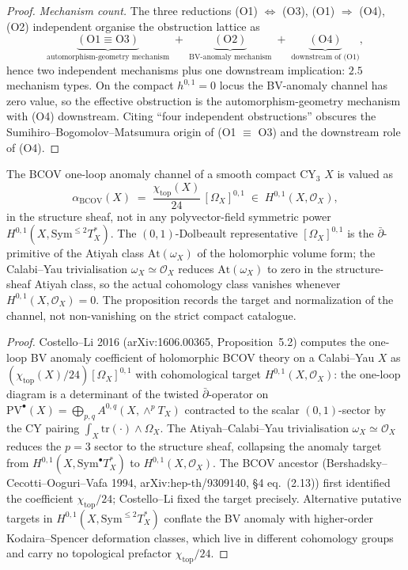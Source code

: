 \begin{proof}
\emph{Mechanism count.} The three reductions (O1) $\Leftrightarrow$
(O3), (O1) $\Rightarrow$ (O4), (O2) independent organise the obstruction
lattice as
\[
 \underbrace{(\mathrm{O}1 \equiv \mathrm{O}3)}_{\text{automorphism-geometry mechanism}}
 \;+\;
 \underbrace{(\mathrm{O}2)}_{\text{BV-anomaly mechanism}}
 \;+\;
 \underbrace{(\mathrm{O}4)}_{\text{downstream of (O1)}},
\]
hence two independent mechanisms plus one downstream implication:
$2.5$ mechanism types. On the compact $h^{0,1}=0$ locus the BV-anomaly
channel has zero value, so the effective obstruction is the
automorphism-geometry mechanism with (O4) downstream. Citing ``four
independent obstructions'' obscures the Sumihiro--Bogomolov--Matsumura
origin of (O1 $\equiv$ O3) and the downstream role of (O4).
\end{proof}

\begin{proposition}
\label{prop:cy-c-beyond-bcov-target}
The BCOV one-loop anomaly channel of a smooth compact CY$_3$ $X$ is valued as
\[
 \alpha_{\mathrm{BCOV}}(X) \;=\;
 \frac{\chi_{\mathrm{top}}(X)}{24}\, [\Omega_X]^{0,1}
 \;\in\; H^{0,1}(X, \mathcal O_X),
\]
in the structure sheaf, not in any polyvector-field symmetric
power $H^{0,1}(X, \mathrm{Sym}^{\leq 2} T_X^*)$. The $(0,1)$-Dolbeault
representative $[\Omega_X]^{0,1}$ is the $\bar\partial$-primitive of the
Atiyah class $\mathrm{At}(\omega_X)$ of the holomorphic volume form;
the Calabi--Yau trivialisation $\omega_X \simeq \mathcal O_X$ reduces
$\mathrm{At}(\omega_X)$ to zero in the structure-sheaf Atiyah class,
so the actual cohomology class vanishes whenever $H^{0,1}(X,\mathcal O_X)=0$.
The proposition records the target and normalization of the channel, not
non-vanishing on the strict compact catalogue.
\end{proposition}

\begin{proof}
Costello--Li 2016 (arXiv:1606.00365, Proposition~5.2) computes the
one-loop BV anomaly coefficient of holomorphic BCOV theory on a
Calabi--Yau $X$ as $(\chi_{\mathrm{top}}(X)/24) [\Omega_X]^{0,1}$ with
cohomological target $H^{0,1}(X, \mathcal O_X)$: the one-loop diagram
is a determinant of the twisted $\bar\partial$-operator on
$\mathrm{PV}^\bullet(X) = \bigoplus_{p, q} A^{0, q}(X, \wedge^p T_X)$
contracted to the scalar $(0, 1)$-sector by the CY pairing
$\int_X \mathrm{tr}(\cdot) \wedge \Omega_X$. The Atiyah--Calabi--Yau
trivialisation $\omega_X \simeq \mathcal O_X$ reduces the $p = 3$
sector to the structure sheaf, collapsing the anomaly target from
$H^{0,1}(X, \mathrm{Sym}^\bullet T_X^*)$ to $H^{0,1}(X, \mathcal O_X)$.
The BCOV ancestor (Bershadsky--Cecotti--Ooguri--Vafa 1994,
arXiv:hep-th/9309140, \S 4 eq.~(2.13)) first identified the coefficient
$\chi_{\mathrm{top}}/24$; Costello--Li fixed the target precisely.
Alternative putative targets in $H^{0,1}(X, \mathrm{Sym}^{\leq 2} T_X^*)$
conflate the BV anomaly with higher-order Kodaira--Spencer deformation
classes, which live in different cohomology groups and carry no
topological prefactor $\chi_{\mathrm{top}}/24$.
\end{proof}

